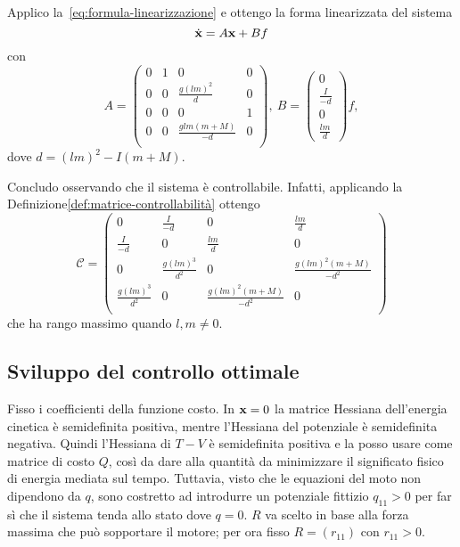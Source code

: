 Applico la~\eqref{eq:formula-linearizzazione} e ottengo la forma linearizzata
del sistema
\begin{equation*}
        \dot {\mathbf{x}} = A\mathbf{x} + Bf \\
\end{equation*}
con
\begin{equation*}
    A = \left(
            \begin{array}{cccc}
                0&1&0&0\\
                0&0&\frac{g(lm)^2}{d}&0\\
                0&0&0&1\\
                0&0&\frac{glm(m+M)}{-d}&0\\
            \end{array}
        \right),\
    B = \left(\begin{array}{c}0\\\frac{I}{-d}\\0\\\frac{lm}{d}\end{array}\right)f,
\end{equation*}
dove $d = (lm)^2-I(m+M)$.

Concludo osservando che il sistema è controllabile.
Infatti, applicando la Definizione\ref{def:matrice-controllabilità}
ottengo
\begin{equation*}
    \mathcal C = \left(
        \begin{array}{cccc}
            0&\frac I {-d}&0&\frac{lm} d\\
            \frac I {-d}&0&\frac{lm} d&0\\
            0&\frac{g(lm)^3}{d^2}&0&\frac{g(lm)^2(m+M)}{-d^2}\\
            \frac{g(lm)^3}{d^2}&0&\frac{g(lm)^2(m+M)}{-d^2}&0\\
        \end{array}
        \right)
\end{equation*}
che ha rango massimo quando $l, m \neq 0$.

\subsection{Sviluppo del controllo ottimale}
Fisso i coefficienti della funzione costo.
In $\mathbf{x} = 0$ la matrice Hessiana dell'energia cinetica è
semidefinita positiva, mentre l'Hessiana del potenziale è
semidefinita negativa.
Quindi l'Hessiana di $T - V$ è semidefinita positiva e
la posso usare come matrice di costo $Q$,
così da dare alla quantità
da minimizzare il significato fisico di energia mediata sul tempo.
Tuttavia, visto che le equazioni del moto non dipendono da $q$,
sono costretto ad introdurre un potenziale fittizio
$q_{11} > 0$ per far sì che il sistema tenda allo
stato dove $q = 0$.
$R$ va scelto in base alla forza massima che può sopportare
il motore; per ora fisso $R = (r_{11})$ con $r_{11} > 0$.

